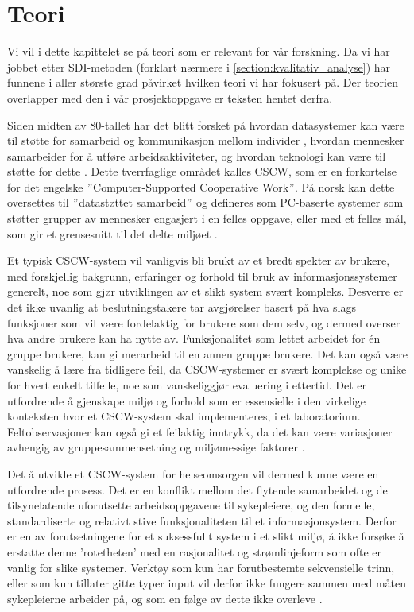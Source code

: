 \chapter{Teori}
\label{chp:teori} 

Vi vil i dette kapittelet se på teori som er relevant for vår forskning. Da vi har jobbet etter SDI-metoden (forklart nærmere i \ref{section:kvalitativ_analyse}) har funnene i aller største grad påvirket hvilken teori vi har fokusert på. Der teorien overlapper med den i vår prosjektoppgave \citep{Sund13} er teksten hentet derfra. 

\noindent
Siden midten av 80-tallet har det blitt forsket på hvordan datasystemer kan være til støtte for samarbeid og kommunikasjon mellom individer \citep{Rogers94}, hvordan mennesker samarbeider for å utføre arbeidsaktiviteter, og hvordan teknologi kan være til støtte for dette \citep{Ellis91}. Dette tverrfaglige området kalles CSCW, som er en forkortelse for det engelske $"$Computer-Supported Cooperative Work$"$. På norsk kan dette oversettes til $"$datastøttet samarbeid$"$ og defineres som PC-baserte systemer som støtter grupper av mennesker engasjert i en felles oppgave, eller med et felles mål, som gir et grensesnitt til det delte miljøet \citep{Ellis91}.

\noindent
Et typisk CSCW-system vil vanligvis bli brukt av et bredt spekter av brukere, med forskjellig bakgrunn, erfaringer og forhold til bruk av informasjonssystemer generelt, noe som gjør utviklingen av et slikt system svært kompleks. Desverre er det ikke uvanlig at beslutningstakere tar avgjørelser basert på hva slags funksjoner som vil være fordelaktig for brukere som dem selv, og dermed overser hva andre brukere kan ha nytte av. Funksjonalitet som lettet arbeidet for én gruppe brukere, kan gi merarbeid til en annen gruppe brukere. Det kan også være vanskelig å lære fra tidligere feil, da CSCW-systemer er svært komplekse og unike for hvert enkelt tilfelle, noe som vanskeliggjør evaluering i ettertid. Det er utfordrende å gjenskape miljø og forhold som er essensielle i den virkelige konteksten hvor et CSCW-system skal implementeres, i et laboratorium. Feltobservasjoner kan også gi et feilaktig inntrykk, da det kan være variasjoner avhengig av gruppesammensetning og miljømessige faktorer \citep{Berg99}.


\noindent
Det å utvikle et CSCW-system for helseomsorgen vil dermed kunne være en utfordrende prosess. Det er en konflikt mellom det flytende samarbeidet og de tilsynelatende uforutsette arbeidsoppgavene til sykepleiere, og den formelle, standardiserte og relativt stive funksjonaliteten til et informasjonsystem. Derfor er en av forutsetningene for et suksessfullt system i et slikt miljø, å ikke forsøke å erstatte denne 'rotetheten' med en rasjonalitet og strømlinjeform som ofte er vanlig for slike systemer. Verktøy som kun har forutbestemte sekvensielle trinn, eller som kun tillater gitte typer input vil derfor ikke fungere sammen med måten sykepleierne arbeider på, og som en følge av dette ikke overleve \citep{Berg99}.